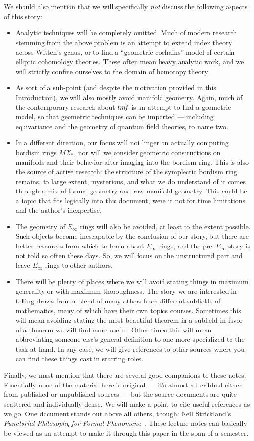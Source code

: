 We should also mention that we will specifically \emph{not} discuss the following aspects of this story:
\begin{itemize}
\item Analytic techniques will be completely omitted.  Much of modern research stemming from the above problem is an attempt to extend index theory across Witten's genus, or to find a ``geometric cochains'' model of certain elliptic cohomology theories.  These often mean heavy analytic work, and we will strictly confine ourselves to the domain of homotopy theory.
\item As sort of a sub-point (and despite the motivation provided in this Introduction), we will also mostly avoid manifold geometry.  Again, much of the contemporary research about $\mathit{tmf}$ is an attempt to find a geometric model, so that geometric techniques can be imported --- including equivariance and the geometry of quantum field theories, to name two.
\item In a different direction, our focus will not linger on actually computing bordism rings $MX_*$, nor will we consider geometric constructions on manifolds and their behavior after imaging into the bordism ring.  This is also the source of active research: the structure of the symplectic bordism ring remains, to large extent, mysterious, and what we do understand of it comes through a mix of formal geometry and raw manifold geometry.  This could be a topic that fits logically into this document, were it not for time limitations and the author's inexpertise.
\item The geometry of $E_\infty$ rings will also be avoided, at least to the extent possible.  Such objects become inescapable by the conclusion of our story, but there are better resources from which to learn about $E_\infty$ rings, and the pre--$E_\infty$ story is not told so often these days.  So, we will focus on the unstructured part and leave $E_\infty$ rings to other authors.
\item There will be plenty of places where we will avoid stating things in maximum generality or with maximum thoroughness.  The story we are interested in telling draws from a blend of many others from different subfields of mathematics, many of which have their own topics courses.  Sometimes this will mean avoiding stating the most beautiful theorem in a subfield in favor of a theorem we will find more useful.  Other times this will mean abbreviating someone else's general definition to one more specialized to the task at hand.  In any case, we will give references to other sources where you can find these things cast in starring roles.
\end{itemize}

Finally, we must mention that there are several good companions to these notes.  Essentially none of the material here is original --- it's almost all cribbed either from published or unpublished sources --- but the source documents are quite scattered and individually dense.  We will make a point to cite useful references as we go.  One document stands out above all others, though: Neil Strickland's \textit{Functorial Philosophy for Formal Phenomena}~\cite{StricklandFPFP}.  These lecture notes can basically be viewed as an attempt to make it through this paper in the span of a semester.
